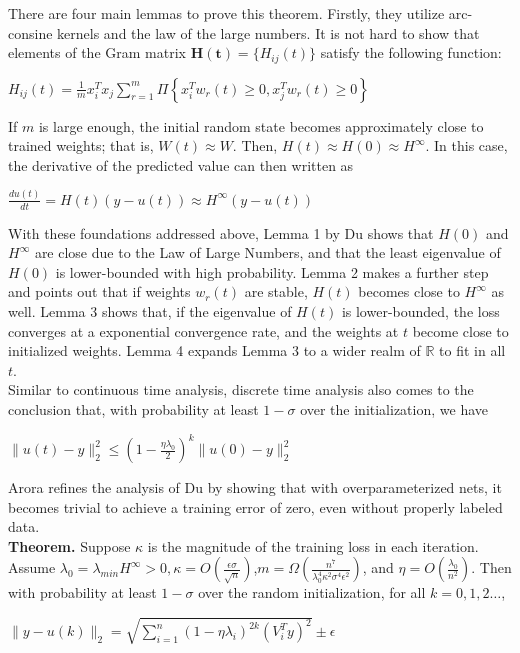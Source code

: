 \documentclass{article}
\begin{document}
There are four main lemmas to prove this theorem. Firstly, they utilize arc-consine kernels and the law of the large numbers. 
It is not hard to show that elements of the Gram matrix $\mathbf{H(t)}=\{H_{ij}(t)\}$ satisfy the following function:
\begin{center}
    $H_{ij}(t) = \frac{1}{m} x_i^T x_j\sum_{r=1}^{m}\Pi\left\{ x_i^T w_r(t)\geq 0,x_j^T w_r(t)\geq 0\right\}$
\end{center}
If $m$ is large enough, the initial random state becomes approximately close to trained weights; that is, $W(t)\approx W$. Then, $H(t) \approx H(0) \approx H^{\infty}$. In this case, the derivative of the predicted value can then written as 
\begin{center}
    $\frac{d u(t)}{dt} = H(t)(y-u(t)) \approx H^{\infty}(y-u(t))$
\end{center}
With these foundations addressed above, Lemma 1 by Du shows that $H(0)$ and $H^{\infty}$ are close due to the Law of Large Numbers, and that the least eigenvalue of $H(0)$ is lower-bounded with high probability. Lemma 2 makes a further step and points out that if weights $w_r(t)$ are stable, $H(t)$ becomes close to $H^{\infty}$ as well. Lemma 3 shows that, if the eigenvalue of $H(t)$ is lower-bounded, the loss converges at a exponential convergence rate, and the weights at $t$ become close to initialized weights. Lemma 4 expands Lemma 3 to a wider realm of $\mathbb{R}$ to fit in all $t$. \\ 

Similar to continuous time analysis, discrete time analysis also comes to the conclusion that, with probability at least $1-\sigma$ over the initialization, we have 
\begin{center}
    $\|u(t)-y\|^2_2 \leq (1-\frac{\eta \lambda_0}{2})^k\|u(0)-y\|^2_2$
\end{center}

Arora \cite{Arora} refines the analysis of Du \cite{SimonDu} by showing that with overparameterized nets, it becomes trivial to achieve a training error of zero, even without properly labeled data. \\

\textbf{Theorem.} Suppose $\kappa$ is the magnitude of the training loss in each iteration. Assume $\lambda_0 = \lambda_{min} H^{\infty} > 0, \kappa = O (\frac{\epsilon\sigma}{\sqrt{n}})$,$m = \Omega(\frac{n^7}{\lambda_0^4 \kappa^2\sigma^4\epsilon^2})$, and $\eta = O(\frac{\lambda_0}{n^2})$. Then with probability at least $1-\sigma$ over the random initialization, for all $k = 0,1,2 …$,
\begin{center}
    $\|y-u(k)\|_2 = \sqrt{\sum_{i=1}^n (1-\eta\lambda_i)^{2k} (V_i^T y)^2}\pm\epsilon$
\end{center}
\end{document}
